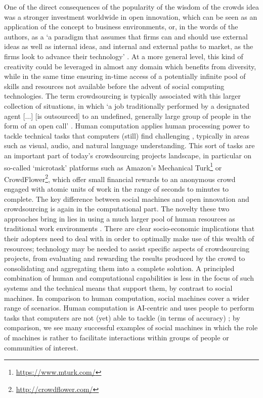\documentclass{sig-alternate}
\begin{document}
One of the direct consequences of the popularity of the wisdom of the crowds idea was a stronger investment worldwide in open innovation, which can be seen as an application of the concept to business environments, or, in the words of the authors, as a `a paradigm that assumes that firms can and should use external ideas as well as internal ideas, and internal and external paths to market, as the firms look to advance their technology' \cite{chesbrough2003}. At a more general level, this kind of creativity could be leveraged in almost any domain which benefits from diversity, while in the same time ensuring in-time access of a potentially infinite pool of skills and resources not available before the advent of social computing technologies. The term crowdsourcing is typically associated with this larger collection of situations, in which `a job traditionally performed by a designated agent [...] [is outsourced] to an undefined, generally large group of people in the form of an open call' \cite{howe2006crowdsourcing}. Human computation applies human processing power to tackle technical tasks that computers (still) find challenging \cite{von2009human}, typically in areas such as visual, audio, and natural language understanding. This sort of tasks are an important part of today's crowdsourcing projects landscape, in particular on so-called `microtask' platforms such as Amazon's Mechanical Turk\footnote{\url{https://www.mturk.com/}} or CrowdFlower\footnote{\url{http://crowdflower.com/}}, which offer small financial rewards to an anonymous crowd engaged with atomic units of work in the range of seconds to minutes to complete. The key difference between social machines and open innovation and crowdsourcing is again in the computational part. The novelty these two approaches bring in lies in using a much larger pool of human resources as traditional work environments \cite{quinn2011human}. There are clear socio-economic implications that their adopters need to deal with in order to optimally make use of this wealth of resources; technology may be needed to assist specific aspects of crowdsourcing projects, from evaluating and rewarding the results produced by the crowd to consolidating and aggregating them into a complete solution. A principled combination of human and computational capabilities is less in the focus of such systems and the technical means that support them, by contrast to social machines. In comparison to human computation, social machines cover a wider range of scenarios. Human computation is AI-centric and uses people to perform tasks that computers are not (yet) able to tackle (in terms of accuracy) \cite{quinn2011human}; by comparison, we see many successful examples of social machines in which the role of machines is rather to facilitate interactions within groups of people or communities of interest.
\end{document}
